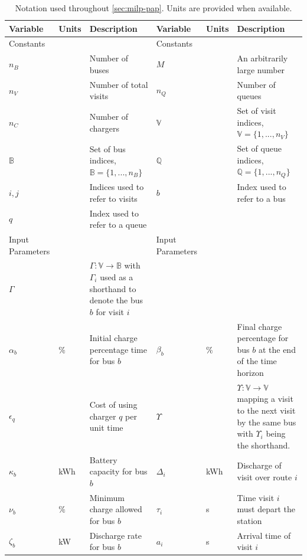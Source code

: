 \documentclass[ee,thesis]{usuthesis}
\begin{document}
\begin{landscape}
\begin{table}[htbp]
\caption{\label{tab:variables}Notation used throughout \ref{sec:milp-pap}. Units are provided when available.}
\centering
\begin{tabularx}{\paperwidth}{L{0.2} L{0.12} L{0.8} L{0.2} L{0.12} L{0.8}}
\textbf{Variable} & \textbf{Units} & \textbf{Description} & \textbf{Variable} & \textbf{Units} & \textbf{Description}\\[0pt]
\hline
Constants &  &  & Constants &  & \\[0pt]
\(n_B\) &  & Number of buses & \(M\) &  & An arbitrarily large number\\[0pt]
\(n_V\) &  & Number of total visits & \(n_Q\) &  & Number of queues\\[0pt]
\(n_C\) &  & Number of chargers & \(\mathbb{V}\) &  & Set of visit indices, \(\mathbb{V} = \{1, ..., n_V\}\)\\[0pt]
\(\mathbb{B}\) &  & Set of bus indices, \(\mathbb{B} = \{1, ..., n_B\}\) & \(\mathbb{Q}\) &  & Set of queue indices, \(\mathbb{Q} = \{1, ..., n_Q\}\)\\[0pt]
\(i,j\) &  & Indices used to refer to visits & \(b\) &  & Index used to refer to a bus\\[0pt]
\(q\) &  & Index used to refer to a queue &  &  & \\[0pt]
\hline
Input Parameters &  &  & Input Parameters &  & \\[0pt]
\(\Gamma\) &  & \(\Gamma: \mathbb{V} \rightarrow \mathbb{B}\) with \(\Gamma_i\) used as a shorthand to denote the bus \(b\) for visit \(i\) &  &  & \\[0pt]
\(\alpha_b\) & \(\%\) & Initial charge percentage time for bus \(b\) & \(\beta_b\) & \(\%\) & Final charge percentage for bus \(b\) at the end of the time horizon\\[0pt]
\(\epsilon_q\) &  & Cost of using charger \(q\) per unit time & \(\Upsilon\) &  & \(\Upsilon: \mathbb{V} \rightarrow \mathbb{V}\) mapping a visit to the next visit by the same bus with \(\Upsilon_i\) being the shorthand.\\[0pt]
\(\kappa_b\) & kWh & Battery capacity for bus \(b\) & \(\Delta_i\) & kWh & Discharge of visit over route \(i\)\\[0pt]
\(\nu_b\) & \(\%\) & Minimum charge allowed for bus \(b\) & \(\tau_i\) & s & Time visit \(i\) must depart the station\\[0pt]
\(\zeta_b\) & kW & Discharge rate for bus \(b\) & \(a_i\) & s & Arrival time of visit \(i\)\\[0pt]

\end{tabularx}
\end{table}
\end{landscape}
\end{document}
